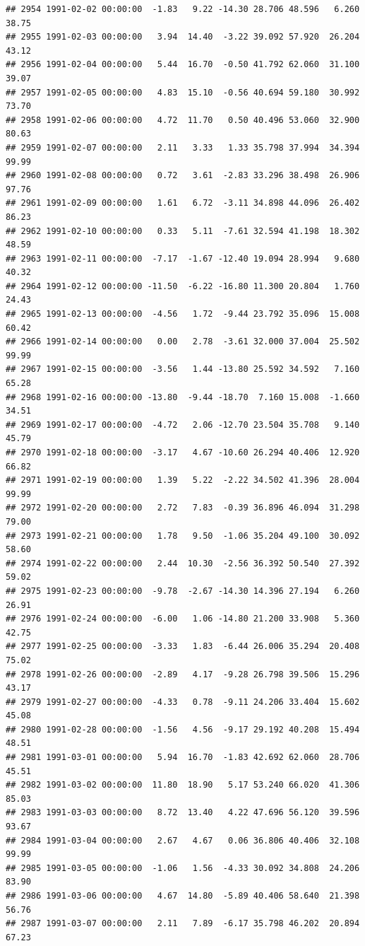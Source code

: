 \documentclass{article}\usepackage{graphicx, color}
\makeatletter
\newenvironment{kframe}{%
 \def\at@end@of@kframe{}%
 \ifinner\ifhmode%
  \def\at@end@of@kframe{\end{minipage}}%
  \begin{minipage}{\columnwidth}%
 \fi\fi%
 \def\FrameCommand##1{\hskip\@totalleftmargin \hskip-\fboxsep
 \colorbox{shadecolor}{##1}\hskip-\fboxsep
     \hskip-\linewidth \hskip-\@totalleftmargin \hskip\columnwidth}%
 \MakeFramed {\advance\hsize-\width
   \@totalleftmargin\z@ \linewidth\hsize
   \@setminipage}}%
 {\par\unskip\endMakeFramed%
 \at@end@of@kframe}
\newenvironment{knitrout}{}{} %
\makeatother
\begin{document}
\begin{knitrout}
\begin{kframe}
\begin{verbatim}
## 2954 1991-02-02 00:00:00  -1.83   9.22 -14.30 28.706 48.596   6.260  38.75
## 2955 1991-02-03 00:00:00   3.94  14.40  -3.22 39.092 57.920  26.204  43.12
## 2956 1991-02-04 00:00:00   5.44  16.70  -0.50 41.792 62.060  31.100  39.07
## 2957 1991-02-05 00:00:00   4.83  15.10  -0.56 40.694 59.180  30.992  73.70
## 2958 1991-02-06 00:00:00   4.72  11.70   0.50 40.496 53.060  32.900  80.63
## 2959 1991-02-07 00:00:00   2.11   3.33   1.33 35.798 37.994  34.394  99.99
## 2960 1991-02-08 00:00:00   0.72   3.61  -2.83 33.296 38.498  26.906  97.76
## 2961 1991-02-09 00:00:00   1.61   6.72  -3.11 34.898 44.096  26.402  86.23
## 2962 1991-02-10 00:00:00   0.33   5.11  -7.61 32.594 41.198  18.302  48.59
## 2963 1991-02-11 00:00:00  -7.17  -1.67 -12.40 19.094 28.994   9.680  40.32
## 2964 1991-02-12 00:00:00 -11.50  -6.22 -16.80 11.300 20.804   1.760  24.43
## 2965 1991-02-13 00:00:00  -4.56   1.72  -9.44 23.792 35.096  15.008  60.42
## 2966 1991-02-14 00:00:00   0.00   2.78  -3.61 32.000 37.004  25.502  99.99
## 2967 1991-02-15 00:00:00  -3.56   1.44 -13.80 25.592 34.592   7.160  65.28
## 2968 1991-02-16 00:00:00 -13.80  -9.44 -18.70  7.160 15.008  -1.660  34.51
## 2969 1991-02-17 00:00:00  -4.72   2.06 -12.70 23.504 35.708   9.140  45.79
## 2970 1991-02-18 00:00:00  -3.17   4.67 -10.60 26.294 40.406  12.920  66.82
## 2971 1991-02-19 00:00:00   1.39   5.22  -2.22 34.502 41.396  28.004  99.99
## 2972 1991-02-20 00:00:00   2.72   7.83  -0.39 36.896 46.094  31.298  79.00
## 2973 1991-02-21 00:00:00   1.78   9.50  -1.06 35.204 49.100  30.092  58.60
## 2974 1991-02-22 00:00:00   2.44  10.30  -2.56 36.392 50.540  27.392  59.02
## 2975 1991-02-23 00:00:00  -9.78  -2.67 -14.30 14.396 27.194   6.260  26.91
## 2976 1991-02-24 00:00:00  -6.00   1.06 -14.80 21.200 33.908   5.360  42.75
## 2977 1991-02-25 00:00:00  -3.33   1.83  -6.44 26.006 35.294  20.408  75.02
## 2978 1991-02-26 00:00:00  -2.89   4.17  -9.28 26.798 39.506  15.296  43.17
## 2979 1991-02-27 00:00:00  -4.33   0.78  -9.11 24.206 33.404  15.602  45.08
## 2980 1991-02-28 00:00:00  -1.56   4.56  -9.17 29.192 40.208  15.494  48.51
## 2981 1991-03-01 00:00:00   5.94  16.70  -1.83 42.692 62.060  28.706  45.51
## 2982 1991-03-02 00:00:00  11.80  18.90   5.17 53.240 66.020  41.306  85.03
## 2983 1991-03-03 00:00:00   8.72  13.40   4.22 47.696 56.120  39.596  93.67
## 2984 1991-03-04 00:00:00   2.67   4.67   0.06 36.806 40.406  32.108  99.99
## 2985 1991-03-05 00:00:00  -1.06   1.56  -4.33 30.092 34.808  24.206  83.90
## 2986 1991-03-06 00:00:00   4.67  14.80  -5.89 40.406 58.640  21.398  56.76
## 2987 1991-03-07 00:00:00   2.11   7.89  -6.17 35.798 46.202  20.894  67.23

\end{verbatim}
\end{kframe}
\end{knitrout}
\end{document}
